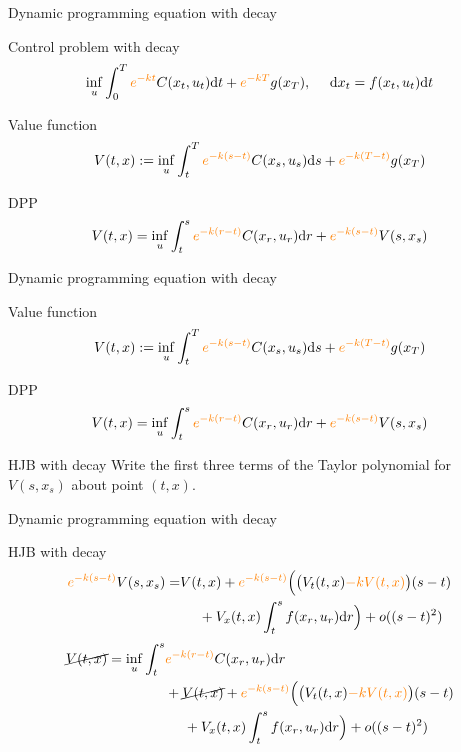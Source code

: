 \documentclass[color=usenames,dvipsnames]{beamer}
\newcommand{\dt}{\text{\normalfont d}t}
\newcommand{\ds}{\text{\normalfont d}s}
\newcommand{\dr}{\text{\normalfont d}r}
\newcommand{\dx}{\text{\normalfont d}x}
\begin{document}

\begin{frame}{Dynamic programming equation with decay}
    \begin{block}
        {Control problem with decay}
        \[
        \inf_{u}\int_0^T {\color{orange}e^{-kt}}C(x_t,u_t)\dt+{\color{orange}e^{-kT}}g(x_T),~~~~\dx_t = f(x_t,u_t)\dt
        \]
    \end{block}
    \begin{block}
        {Value function}
        \[
        V(t,x):=\inf_{u}\int_t^T {\color{orange}e^{-k(s-t)}}C(x_s,u_s)\ds + {\color{orange}e^{-k(T-t)}}g(x_T)
        \]
    \end{block}
    \begin{block}
        {DPP}
        \[
        V(t,x)=\inf_{u}\int_t^s {\color{orange}e^{-k(r-t)}}C(x_r,u_r)\dr + {\color{orange}e^{-k(s-t)}}V(s,x_s)
        \]
    \end{block}
\end{frame}

\begin{frame}{Dynamic programming equation with decay}
    \begin{block}
        {Value function}
        \[
        V(t,x):=\inf_{u}\int_t^T {\color{orange}e^{-k(s-t)}}C(x_s,u_s)\ds + {\color{orange}e^{-k(T-t)}}g(x_T)
        \]
    \end{block}
    \begin{block}
        {DPP}
        \[
        V(t,x)=\inf_{u}\int_t^s {\color{orange}e^{-k(r-t)}}C(x_r,u_r)\dr + {\color{orange}e^{-k(s-t)}}V(s,x_s)
        \]
    \end{block}
        \begin{block}
        {HJB with decay}
        Write the first three terms of the Taylor polynomial for $V(s,x_s)$ about point $(t,x)$.
    \end{block}
\end{frame}

\begin{frame}{Dynamic programming equation with decay}
        \begin{block}
        {HJB with decay}
        \[
        \begin{split}
             {\color{orange}e^{-k(s-t)}}V(s,x_s) = &V(t,x) + {\color{orange}e^{-k(s-t)}}\Big(\big(V_t(t,x) {\color{orange}- k V(t,x)}\big)(s-t)\\
             &~~~~+ V_x(t,x)\int_t^s f(x_r,u_r)\dr\Big) + o((s-t)^2)
        \end{split}
        \]
        \[
        \begin{split}
            \cancel{V(t,x)}=\inf_{u}\int_t^s &{\color{orange}e^{-k(r-t)}}C(x_r,u_r)\dr \\
            &+ \cancel{V(t,x)} + {\color{orange}e^{-k(s-t)}}\Big(\big(V_t(t,x) {\color{orange}- k V(t,x)}\big)(s-t)\\
             &~~~~+ V_x(t,x)\int_t^s f(x_r,u_r)\dr\Big) + o((s-t)^2)
        \end{split}
        \]
    \end{block}
\end{frame}
\end{document}
